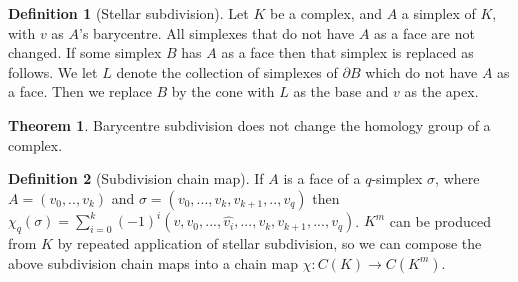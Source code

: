 \documentclass{article}
\theoremstyle{definition}
\newtheorem{definition}{Definition}[section]
\newtheorem{theorem}{Theorem}[section]
\theoremstyle{remark}
\theoremstyle{remark}
\begin{document}
\begin{definition}[Stellar subdivision]
    Let $K$ be a complex, and $A$ a simplex of $K$, with $v$ as $A$'s barycentre. All simplexes that do not have $A$ as a face are not changed. If some simplex $B$ has $A$ as a face then that simplex is replaced as follows. We let $L$ denote the collection of simplexes of $\partial B$ which do not have $A$ as a face. Then we replace $B$ by the cone with $L$ as the base and $v$ as the apex. 
\end{definition}

\begin{theorem}
    Barycentre subdivision does not change the homology group of a complex.
\end{theorem}

\begin{definition}[Subdivision chain map]
    If $A$ is a face of a $q$-simplex $\sigma$, where $A = (v_0, .., v_k)$ and $\sigma = (v_0, ..., v_k, v_{k+1}, .., v_q)$ then $\chi_q(\sigma) = \sum_{i=0}^k (-1)^i (v, v_0,..., \hat{v_i}, ..., v_k, v_{k+1}, ..., v_q)$.
    $K^m$ can be produced from $K$ by repeated application of stellar subdivision, so we can compose the above subdivision chain maps into a chain map $\chi : C(K) \to C(K^m)$. 
\end{definition}
\end{document}
